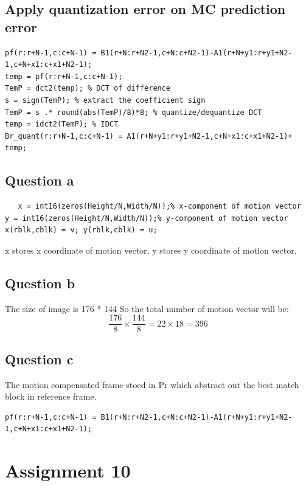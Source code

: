 \documentclass[titlepage]{article}
\begin{document}
\subsection{Apply quantization error on MC prediction error}
\label{sec:org1d8ee8a}
\begin{verbatim}
pf(r:r+N-1,c:c+N-1) = B1(r+N:r+N2-1,c+N:c+N2-1)-A1(r+N+y1:r+y1+N2-1,c+N+x1:c+x1+N2-1);
temp = pf(r:r+N-1,c:c+N-1);
TemP = dct2(temp); % DCT of difference
s = sign(TemP); % extract the coefficient sign
TemP = s .* round(abs(TemP)/8)*8; % quantize/dequantize DCT
temp = idct2(TemP); % IDCT
Br_quant(r:r+N-1,c:c+N-1) = A1(r+N+y1:r+y1+N2-1,c+N+x1:c+x1+N2-1)+ temp;
\end{verbatim}

\subsection{Question a}
\label{sec:orgade3232}

\begin{verbatim}
   x = int16(zeros(Height/N,Width/N));% x-component of motion vector
y = int16(zeros(Height/N,Width/N));% y-component of motion vector
x(rblk,cblk) = v; y(rblk,cblk) = u;
\end{verbatim}

x stores x coordinate of motion vector, y stores y coordinate of motion vector.

\subsection{Question b}
\label{sec:orgba33989}
The size of image is 176 * 144
So the total number of motion vector will be: $$\frac{176}{8}\times\frac{144}{8} = 22 \times 18 = 396$$

\subsection{Question c}
\label{sec:orgece9221}
The motion compensated frame stoed in Pr which abstract out the best match block in reference frame.
\begin{verbatim}
pf(r:r+N-1,c:c+N-1) = B1(r+N:r+N2-1,c+N:c+N2-1)-A1(r+N+y1:r+y1+N2-1,c+N+x1:c+x1+N2-1);
\end{verbatim}



\newpage
\section{Assignment 10}
\label{sec:org33cff40}
\end{document}
